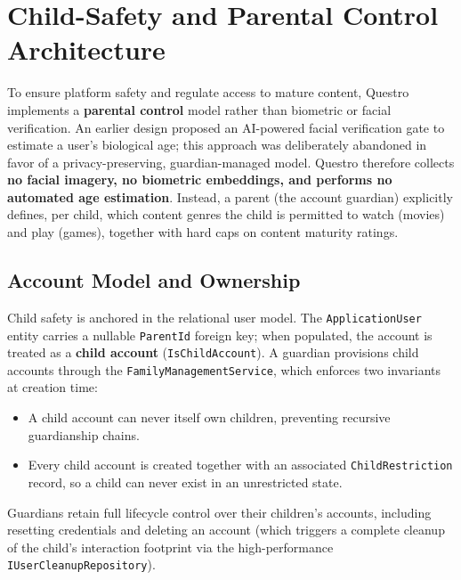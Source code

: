\section{Child-Safety and Parental Control Architecture}
To ensure platform safety and regulate access to mature content, Questro implements a \textbf{parental control} model rather than biometric or facial verification. An earlier design proposed an AI-powered facial verification gate to estimate a user's biological age; this approach was deliberately abandoned in favor of a privacy-preserving, guardian-managed model. Questro therefore collects \textbf{no facial imagery, no biometric embeddings, and performs no automated age estimation}. Instead, a parent (the account guardian) explicitly defines, per child, which content genres the child is permitted to watch (movies) and play (games), together with hard caps on content maturity ratings.

\subsection{Account Model and Ownership}
Child safety is anchored in the relational user model. The \texttt{Application\allowbreak User} entity carries a nullable \texttt{ParentId} foreign key; when populated, the account is treated as a \textbf{child account} (\texttt{IsChildAccount}). A guardian provisions child accounts through the \texttt{Family\allowbreak Management\allowbreak Service}, which enforces two invariants at creation time:
\begin{itemize}
    \item A child account can never itself own children, preventing recursive guardianship chains.
    \item Every child account is created together with an associated \texttt{ChildRestriction} record, so a child can never exist in an unrestricted state.
\end{itemize}
Guardians retain full lifecycle control over their children's accounts, including resetting credentials and deleting an account (which triggers a complete cleanup of the child's interaction footprint via the high-performance \texttt{IUserCleanupRepository}).

